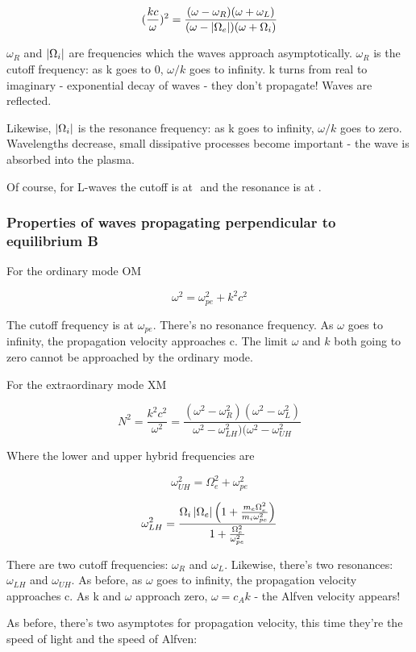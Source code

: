 \documentclass[PlasmaNotes.tex]{subfiles}
\begin{document}
\[(\frac{k c}{\omega})^2 = \frac{(\omega-\omega_R)(\omega+\omega_L)}{(\omega-\left| \Omega_e \right|)(\omega+\Omega_i)} \]

$\omega_R$ and $\left| \Omega_i \right|$ are frequencies which the waves approach asymptotically. $\omega_R$ is the cutoff frequency: as k goes to 0, $\omega/k$ goes to infinity. k turns from real to imaginary - exponential decay of waves - they don't propagate! Waves are reflected.

Likewise, $\left| \Omega_i \right|$ is the resonance frequency: as k goes to infinity, $\omega/k$ goes to zero. Wavelengths decrease, small dissipative processes become important - the wave is absorbed into the plasma.

Of course, for L-waves the cutoff is at $ $ and the resonance is at $ $.



\subsubsection{Properties of waves propagating perpendicular to equilibrium B}

For the ordinary mode OM

\[ \omega^2 = \omega_{pe}^2 + k^2 c^2 \]

The cutoff frequency is at $\omega_{pe}$. There's no resonance frequency. As $\omega$ goes to infinity, the propagation velocity approaches c. The limit $\omega$ and $k$ both going to zero cannot be approached by the ordinary mode.

For the extraordinary mode XM

\[ N^2 = \frac{k^2c^2}{\omega^2} = \frac{(\omega^2-\omega_R^2)(\omega^2-\omega_L^2)}{\omega^2-\omega_{LH}^2)(\omega^2-\omega_{UH}^2} \]

Where the lower and upper hybrid frequencies are

\[ \omega^2_{UH} = \Omega_e^2 + \omega_{pe}^2 \]

\[ \omega^2_{LH} = \frac{\Omega_i \left| \Omega_e \right| \Big(1+\frac{m_e \Omega_e^2}{m_i\omega_{pe}^2}\Big)}{1+\frac{\Omega_e^2}{\omega_{pe}^2}} \]

There are two cutoff frequencies: $\omega_R$ and $\omega_L$. Likewise, there's two resonances: $\omega_{LH}$ and $\omega_{UH}$. As before, as $\omega$ goes to infinity, the propagation velocity approaches c. As k and $\omega$ approach zero, $\omega = c_A k$ - the Alfven velocity appears!

As before, there's two asymptotes for propagation velocity, this time they're the speed of light and the speed of Alfven:
\end{document}

